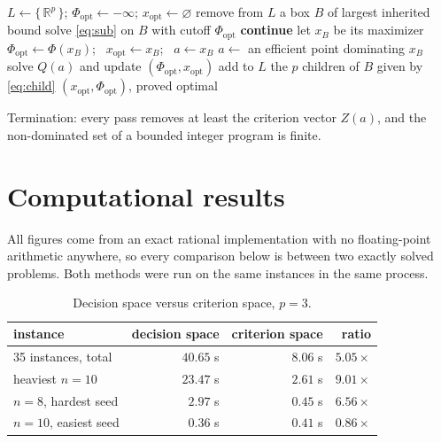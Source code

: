 \documentclass[11pt,a4paper]{article}
\newcommand{\Z}{Z}
\newcommand{\R}{\mathbb{R}}
\begin{document}
\begin{algorithm}[h]
\caption{Criterion-space search for $(P_E)$}
\begin{algorithmic}[1]
\State $L \gets \{\, \R^p \,\}$; \quad $\Phi_{\mathrm{opt}} \gets -\infty$;
       \quad $x_{\mathrm{opt}} \gets \varnothing$
  \State remove from $L$ a box $B$ of largest inherited bound
  \State solve \eqref{eq:sub} on $B$ with cutoff $\Phi_{\mathrm{opt}}$
     \State \textbf{continue} 
  \EndIf
  \State let $x_B$ be its maximizer
     \State $\Phi_{\mathrm{opt}} \gets \Phi(x_B)$; \
            $x_{\mathrm{opt}} \gets x_B$; \ $a \gets x_B$
     \Statex {}
  \Else
     \State $a \gets$ an efficient point dominating $x_B$
     \State solve $Q(a)$ and update $(\Phi_{\mathrm{opt}}, x_{\mathrm{opt}})$
  \EndIf
  \State add to $L$ the $p$ children of $B$ given by \eqref{eq:child}
\EndWhile
\State \Return $(x_{\mathrm{opt}}, \Phi_{\mathrm{opt}})$, proved optimal
\end{algorithmic}
\end{algorithm}

Termination: every pass removes at least the criterion vector $\Z(a)$, and the
non-dominated set of a bounded integer program is finite.

\section{Computational results}

All figures come from an exact rational implementation with no floating-point
arithmetic anywhere, so every comparison below is between two exactly solved
problems. Both methods were run on the same instances in the same process.

\begin{table}[h]
\centering
\caption{Decision space versus criterion space, $p = 3$.}
\begin{tabular}{lrrr}
\toprule
instance & decision space & criterion space & ratio \\
\midrule
35 instances, total & $40.65$ s & $8.06$ s & $5.05\times$ \\
heaviest $n=10$     & $23.47$ s & $2.61$ s & $9.01\times$ \\
$n=8$, hardest seed & $2.97$ s  & $0.45$ s & $6.56\times$ \\
$n=10$, easiest seed& $0.36$ s  & $0.41$ s & $0.86\times$ \\
\bottomrule
\end{tabular}
\end{table}
\end{document}
